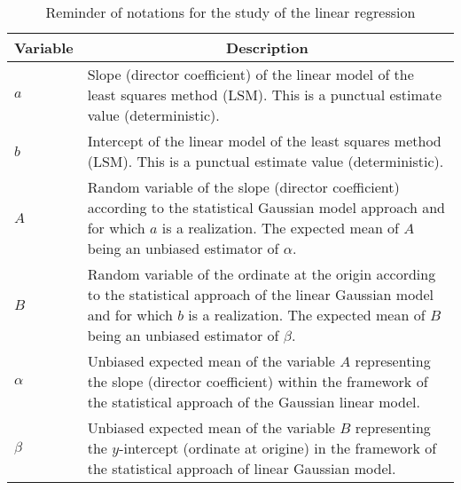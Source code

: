 	\begin{table}[H]
	\begin{center}
			\begin{tabular}{|p{1cm}|p{10cm}|}
				\hline
				\multicolumn{1}{c}{\cellcolor{black!30}\textbf{Variable}} & 
  \multicolumn{1}{c}{\cellcolor{black!30}\textbf{Description}} \\ \hline
				$a$ & Slope (director coefficient) of the linear model of the least squares method (LSM). This is a punctual estimate value (deterministic). \\ \hline
				$b$ & Intercept of the linear model of the least squares method (LSM). This is a punctual estimate value (deterministic).\\ \hline
				$A$ & Random variable of the slope (director coefficient) according to the statistical Gaussian model approach and for which $a$ is a realization. The expected mean of $A$ being an unbiased estimator of $\alpha$.\\ \hline
				$B$ & Random variable of the ordinate at the origin according to the statistical approach of the linear Gaussian model and for which $b$ is a realization. The expected mean of $B$ being an unbiased estimator of $\beta$.  \\ \hline
				$\alpha$ &	Unbiased expected mean of the variable $A$ representing the slope (director coefficient) within the framework of the statistical approach of the Gaussian linear model.  \\ \hline
				$\beta$ & Unbiased expected mean of the variable $B$ representing the $y$-intercept (ordinate at origine) in the framework of the statistical approach of linear Gaussian model.  \\ \hline
		\end{tabular}
	\end{center}
	\caption{Reminder of notations for the study of the linear regression}
	\end{table}
	
